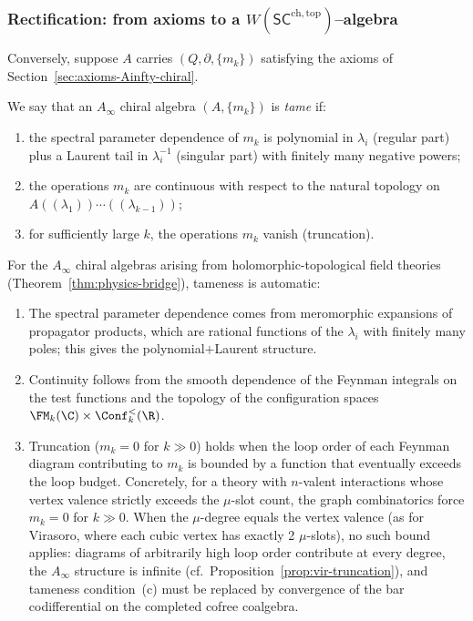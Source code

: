 \subsubsection{Rectification: from axioms to a $W(\mathsf{SC}^{\mathrm{ch,top}})$--algebra}
\label{subsec:rectification}
Conversely, suppose $A$ carries $(Q,\partial,\{m_k\})$ satisfying the axioms of Section~\ref{sec:axioms-Ainfty-chiral}.

\begin{definition}[Tameness]\label{def:tameness}
We say that an $A_\infty$ chiral algebra $(A, \{m_k\})$ is \emph{tame} if:
\begin{enumerate}[label=(\alph*)]
\item the spectral parameter dependence of $m_k$ is polynomial in $\lambda_i$ (regular part) plus a Laurent tail in $\lambda_i^{-1}$ (singular part) with finitely many negative powers;
\item the operations $m_k$ are continuous with respect to the natural topology on $A((\lambda_1)) \cdots ((\lambda_{k-1}))$;
\item for sufficiently large $k$, the operations $m_k$ vanish (truncation).
\end{enumerate}
\end{definition}

\begin{remark}
\label{rem:tameness-HT}
For the $A_\infty$ chiral algebras arising from holomorphic-topological
field theories (Theorem~\ref{thm:physics-bridge}), tameness is
automatic:
\begin{enumerate}[label=\textup{(\alph*)}]
\item The spectral parameter dependence comes from meromorphic
 expansions of propagator products, which are rational functions of the
 $\lambda_i$ with finitely many poles; this gives the
 polynomial$+$Laurent structure.
\item Continuity follows from the smooth dependence of the Feynman
 integrals on the test functions and the topology of the configuration
 spaces $\FM_k(\C) \times \Conf_k^{<}(\R)$.
\item Truncation ($m_k = 0$ for $k \gg 0$) holds when the loop order of
 each Feynman diagram contributing to $m_k$ is bounded by a function
 that eventually exceeds the loop budget. Concretely, for a theory
 with $n$-valent interactions whose vertex valence strictly exceeds the
 $\mu$-slot count, the graph combinatorics force $m_k = 0$ for
 $k \gg 0$. When the $\mu$-degree equals the vertex valence (as for
 Virasoro, where each cubic vertex has exactly 2 $\mu$-slots), no such
 bound applies: diagrams of arbitrarily high loop order contribute at
 every degree, the $A_\infty$ structure is infinite
 (cf.\ Proposition~\ref{prop:vir-truncation}), and tameness
 condition~(c) must be replaced by convergence of the bar codifferential
 on the completed cofree coalgebra.
\end{enumerate}
\end{remark}


